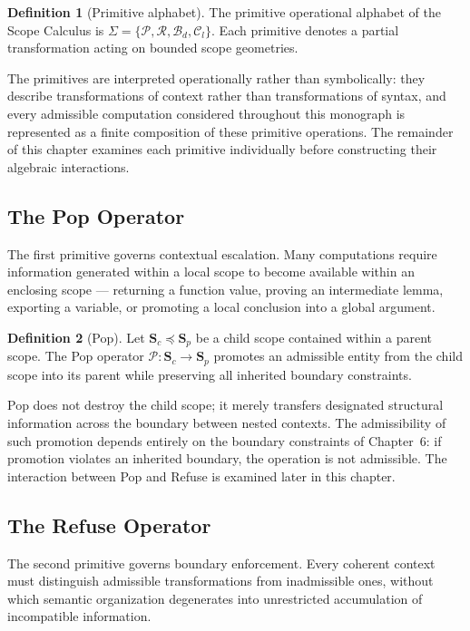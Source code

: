 \documentclass[11pt,twoside,openright]{book}
\numberwithin{equation}{chapter}
\theoremstyle{definition}
\newtheorem{definition}{Definition}[chapter]
\theoremstyle{plain}
\theoremstyle{remark}
\theoremstyle{definition}
\newcommand{\Scope}{\mathbf{S}}
\newcommand{\Alphabet}{\Sigma}
\newcommand{\Pop}{\mathcal{P}}
\newcommand{\Refuse}{\mathcal{R}}
\newcommand{\Bind}{\mathcal{B}_d}
\newcommand{\Collapse}{\mathcal{C}_l}
\newcommand{\ScopeAlphabet}{\Alphabet=\{\Pop,\Refuse,\Bind,\Collapse\}}
\begin{document}
\begin{definition}[Primitive alphabet]
The primitive operational alphabet of the Scope Calculus is
$\ScopeAlphabet$. Each primitive denotes a partial transformation acting
on bounded scope geometries.
\end{definition}

The primitives are interpreted operationally rather than symbolically:
they describe transformations of context rather than transformations of
syntax, and every admissible computation considered throughout this
monograph is represented as a finite composition of these primitive
operations. The remainder of this chapter examines each primitive
individually before constructing their algebraic interactions.

\subsection{The Pop Operator}

The first primitive governs contextual escalation. Many computations
require information generated within a local scope to become available
within an enclosing scope --- returning a function value, proving an
intermediate lemma, exporting a variable, or promoting a local conclusion
into a global argument.

\begin{definition}[Pop]
Let $\Scope_c\preceq\Scope_p$ be a child scope contained within a parent
scope. The Pop operator $\Pop:\Scope_c\to\Scope_p$ promotes an admissible
entity from the child scope into its parent while preserving all
inherited boundary constraints.
\end{definition}

Pop does not destroy the child scope; it merely transfers designated
structural information across the boundary between nested contexts. The
admissibility of such promotion depends entirely on the boundary
constraints of Chapter~6: if promotion violates an inherited boundary, the
operation is not admissible. The interaction between Pop and Refuse is
examined later in this chapter.

\subsection{The Refuse Operator}

The second primitive governs boundary enforcement. Every coherent context
must distinguish admissible transformations from inadmissible ones,
without which semantic organization degenerates into unrestricted
accumulation of incompatible information.
\end{document}
